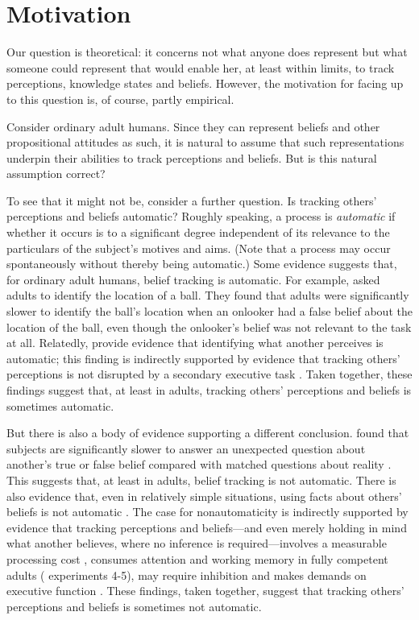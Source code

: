 \documentclass[12pt,\papersize]{extarticle}
\begin{document}
\section{Motivation}
\label{sec:motivation}
Our question is theoretical: it concerns 
not what anyone does represent
but what someone could represent that would enable her, at least within limits, to track perceptions, knowledge states and beliefs.
However, the motivation for facing up to this question is, of course, partly empirical.

Consider ordinary adult humans.
Since they can represent beliefs and other propositional attitudes as such, 
it is natural to assume that such representations underpin their abilities to track perceptions and beliefs.
But is this natural assumption correct?

To see that it might not be, consider a further question.
Is tracking others' perceptions and beliefs automatic?
Roughly speaking,
a process is \emph{automatic} if whether it occurs is to a significant degree independent of its relevance to the particulars of the subject's motives and aims.
(Note that a process may occur spontaneously without thereby being automatic.)  
Some evidence suggests that, for ordinary adult humans, belief tracking is automatic.
For example,
\citet{kovacs_social_2010} asked adults to identify the location of a ball.
They found that adults were significantly slower to identify the ball's location when an onlooker had a false belief about the location of the ball,
even though the onlooker's belief was not relevant to the task at all.
Relatedly, \citet{Samson:2010jm} provide evidence that identifying what another perceives is automatic;  this finding is indirectly supported by  evidence that tracking others' perceptions is not disrupted by a secondary executive task \citep{qureshi:2010_executive}.
Taken together, these findings suggest that, at least in adults, tracking others' perceptions and beliefs is sometimes automatic.

But there is also a body of evidence supporting a different conclusion.
\citet{back:2010_apperly} found that subjects are significantly slower to answer an unexpected question about another's true or false belief compared with matched questions about reality \citep[see also][]{apperly:2006_belief}.
This suggests that, at least in adults, belief tracking is not automatic.
There is also evidence that, even in relatively simple situations, 
using facts about others' beliefs is not automatic \citep{Keysar:2003xu,apperly:2010_limits}.
The case for nonautomaticity is indirectly supported by evidence that tracking perceptions and beliefs---and even merely holding in mind what another believes, where no inference is required---involves a measurable processing cost  \citep{apperly:2008_back,apperly:2010_limits}, consumes attention and working memory in fully competent adults (\citealp{en_1698, lin:2010_reflexively, en_1547} experiments 4-5), may require inhibition \citep{bull:2008_role} and makes demands on executive function \citep{apperly:2004_frontal,samson:2005_seeing}.
These findings, taken together, suggest that tracking others' perceptions and beliefs is sometimes not automatic.
\end{document}
